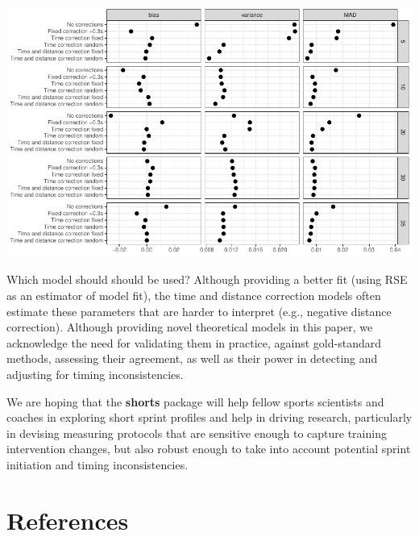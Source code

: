 \documentclass[fleqn,10pt,lineno]{wlpeerj} %
\begin{document}
\begin{center}\includegraphics[width=1\linewidth]{paper_files/figure-latex/unnamed-chunk-66-1} \end{center}

Which model should should be used? Although providing a better fit (using RSE as an estimator of model fit), the time and distance correction models often estimate these parameters that are harder to interpret (e.g., negative distance correction). Although providing novel theoretical models in this paper, we acknowledge the need for validating them in practice, against gold-standard methods, assessing their agreement, as well as their power in detecting and adjusting for timing inconsistencies.

We are hoping that the \textbf{shorts} package will help fellow sports scientists and coaches in exploring short sprint profiles and help in driving research, particularly in devising measuring protocols that are sensitive enough to capture training intervention changes, but also robust enough to take into account potential sprint initiation and timing inconsistencies.

\hypertarget{references}{%
\section*{References}\label{references}}
\end{document}
